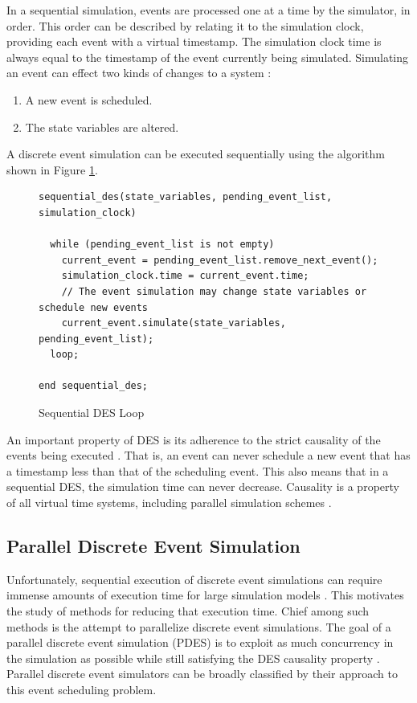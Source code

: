 \documentclass[11pt]{book}
\begin{document}
\noindent
In a sequential simulation, events are processed one at a time by the simulator, in order.
This order can be described by relating it to the simulation clock, providing each event
with a virtual timestamp.  The simulation clock time is always equal to the timestamp of
the event currently being simulated.  Simulating an event can effect two kinds of changes
to a system \cite{fujimoto-pdes}:

\begin{enumerate}
  \item A new event is scheduled.
  \item The state variables are altered.
\end{enumerate}

\noindent
A discrete event simulation can be executed sequentially using the algorithm shown in
Figure \ref{sequential-des}.

\begin{figure}
\centering
\begin{verbatim}
sequential_des(state_variables, pending_event_list, simulation_clock)

  while (pending_event_list is not empty)
    current_event = pending_event_list.remove_next_event();
    simulation_clock.time = current_event.time;
    // The event simulation may change state variables or schedule new events
    current_event.simulate(state_variables, pending_event_list);
  loop;

end sequential_des;
\end{verbatim}
\caption{Sequential DES Loop \cite{jacob-13}}\label{sequential-des}
\end{figure}

An important property of DES is its adherence to the strict causality of the events being
executed \cite{fujimoto-pdes}.  That is, an event can never schedule a new event that has
a timestamp less than that of the scheduling event.  This also means that in a sequential
DES, the simulation time can never decrease.  Causality is a property of all virtual time
systems, including parallel simulation schemes \cite{lamport-78}.

\subsection{Parallel Discrete Event Simulation}

Unfortunately, sequential execution of discrete event simulations can require immense
amounts of execution time for large simulation models \cite{fujimoto-pdes}.  This
motivates the study of methods for reducing that execution time.  Chief among such methods
is the attempt to parallelize discrete event simulations.  The goal of a parallel discrete
event simulation (PDES) is to exploit as much concurrency in the simulation as possible
while still satisfying the DES causality property \cite{fujimoto-89b,fujimoto-90}.
Parallel discrete event simulators can be broadly classified by their approach to this
event scheduling problem.
\end{document}
